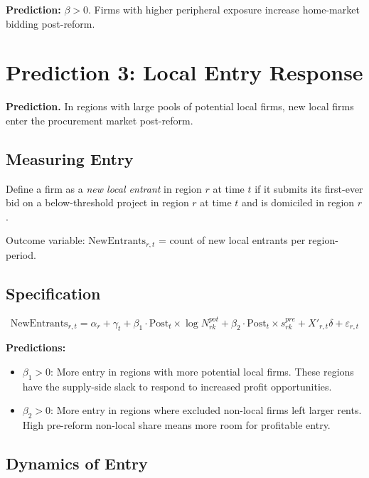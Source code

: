 \documentclass[12pt]{article}
\begin{document}
\textbf{Prediction:} $\beta > 0$. Firms with higher peripheral exposure increase home-market bidding post-reform.

\section{Prediction 3: Local Entry Response}

\textbf{Prediction.} In regions with large pools of potential local firms, new local firms enter the procurement market post-reform.

\subsection{Measuring Entry}

Define a firm as a \emph{new local entrant} in region $r$ at time $t$ if it submits its first-ever bid on a below-threshold project in region $r$ at time $t$ and is domiciled in region $r$.

Outcome variable: $\text{NewEntrants}_{r,t}$ = count of new local entrants per region-period.

\subsection{Specification}

\begin{equation}\label{eq:entry}
    \text{NewEntrants}_{r,t} = \alpha_r + \gamma_t + \beta_1 \cdot \text{Post}_t \times \log N_{rk}^{pot} + \beta_2 \cdot \text{Post}_t \times s_{rk}^{pre} + X'_{r,t}\delta + \varepsilon_{r,t}
\end{equation}

\textbf{Predictions:}
\begin{itemize}[itemsep=2pt]
    \item $\beta_1 > 0$: More entry in regions with more potential local firms. These regions have the supply-side slack to respond to increased profit opportunities.
    \item $\beta_2 > 0$: More entry in regions where excluded non-local firms left larger rents. High pre-reform non-local share means more room for profitable entry.
\end{itemize}

\subsection{Dynamics of Entry}
\end{document}
